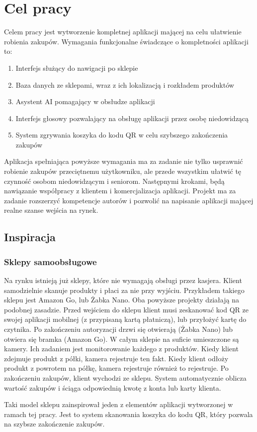 \section{Cel pracy}

Celem pracy jest wytworzenie kompletnej aplikacji mającej na celu ułatwienie robienia zakupów. Wymagania funkcjonalne świadczące o kompletności aplikacji to:
\begin{enumerate}
    \item Interfejs służący do nawigacji po sklepie
    \item Baza danych ze sklepami, wraz z ich lokalizacją i rozkładem produktów
    \item Asystent AI pomagający w obsłudze aplikacji
    \item Interfejs głosowy pozwalający na obsługę aplikacji przez osobę niedowidzącą
    \item System zgrywania koszyka do kodu QR w celu szybszego zakończenia zakupów
\end{enumerate}
Aplikacja spełniająca powyższe wymagania ma za zadanie nie tylko usprawnić robienie zakupów przeciętnemu użytkowniku, ale przede wszystkim ułatwić tę czynność osobom niedowidzącym i seniorom. Następnymi krokami, będą nawiązanie współpracy z klientem i komercjalizacja aplikacji. Projekt ma za zadanie rozszerzyć kompetencje autorów i pozwolić na napisanie aplikacji mającej realne szanse wejścia na rynek. 



\subsection{Inspiracja}

\subsubsection{Sklepy samoobsługowe}
Na rynku istnieją już sklepy, które nie wymagają obsługi przez kasjera. Klient samodzielnie skanuje produkty i płaci za nie przy wyjściu. Przykładem takiego sklepu jest Amazon Go, lub Żabka Nano. Oba powyższe projekty działają na podobnej zasadzie.
Przed wejściem do sklepu klient musi zeskanować kod QR ze swojej aplikacji mobilnej (z przypisaną kartą płatniczą), lub przyłożyć kartę do czytnika. Po zakończeniu autoryzacji drzwi się otwierają (Żabka Nano) lub otwiera się bramka (Amazon Go). W całym sklepie na suficie umieszczone są kamery.
Ich zadaniem jest monitorowanie każdego z produktów. Kiedy klient zdejmuje produkt z półki, kamera rejestruje ten fakt. Kiedy klient odłoży produkt z powrotem na półkę, kamera rejestruje również to rejestruje. Po zakończeniu zakupów, klient wychodzi ze sklepu. System automatycznie oblicza wartość zakupów i ściąga odpowiednią kwotę z konta lub karty klienta.

Taki model sklepu zainspirował jeden z elementów aplikacji wytworzonej w ramach tej pracy. Jest to system skanowania koszyka do kodu QR, który pozwala na szybsze zakończenie zakupów. 

